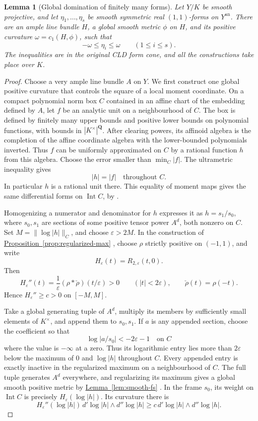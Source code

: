 \documentclass[11pt]{amsart}
\newtheorem{lemma}[theorem]{Lemma}
\theoremstyle{definition}
\theoremstyle{remark}
\numberwithin{equation}{section}
\newcommand{\an}{\mathrm{an}}
\newcommand{\Q}{\mathbf Q}
\newcommand{\namedref}[2]{%
 \begingroup
 \ifstrequal{#1}{Section}{\hypersetup{linkcolor=sectionteal}}{%
  \ifstrequal{#1}{Appendix}{\hypersetup{linkcolor=sectionteal}}{}}%
 \hyperref[#2]{#1~\ref*{#2}}%
 \endgroup}
\DeclareMathOperator{\Int}{Int}
\begin{document}
\begin{lemma}[Global domination of finitely many forms]
\label{lem:global-calibration}
Let \(Y/K\) be smooth projective, and let
\(\eta_1,\ldots,\eta_s\) be smooth symmetric real \((1,1)\)-forms
on \(Y^\an\). There are an ample line bundle \(H\), a global smooth
metric \(\phi\) on \(H\), and its positive curvature
\(\omega=c_1(H,\phi)\), such that
\[
 -\omega\leq\eta_i\leq\omega\qquad(1\leq i\leq s).
\]
The inequalities are in the original CLD form cone, and all the
constructions take place over \(K\).
\end{lemma}

\begin{proof}
Choose a very ample line bundle \(A\) on \(Y\). We first construct
one global positive curvature that controls the square of a local
moment coordinate. On a compact polynomial norm box \(C\) contained
in an affine chart of the embedding defined by \(A\), let \(f\) be
an analytic unit on a neighbourhood of \(C\). The box is defined by
finitely many upper bounds and positive lower bounds on polynomial
functions, with bounds in \(|K^\times|^\Q\). After clearing powers,
its affinoid algebra is the completion of the affine coordinate
algebra with the lower-bounded polynomials inverted.
Thus \(f\) can be uniformly approximated on \(C\) by a rational
function \(h\) from this algebra. Choose the error smaller than
\(\min_C|f|\). The ultrametric inequality gives
\[
 |h|=|f|\quad\text{throughout }C.
\]
In particular \(h\) is a rational unit there. This equality of
moment maps gives the same differential forms on \(\Int C\),
by \cite[Lemma 3.1.10]{CLD12}.

Homogenizing a numerator and denominator for \(h\) expresses it
as \(h=s_1/s_0\), where \(s_0,s_1\) are sections of some
positive tensor power \(A^d\), both nonzero on \(C\).
Set \(M=\|\log|h|\|_C\), and choose
\(\varepsilon>2M\). In the construction of
\namedref{Proposition}{prop:regularized-max}, choose \(\rho\) strictly
positive on \((-1,1)\), and write
\[
 H_\varepsilon(t)=R_{2,\varepsilon}(t,0).
\]
Then
\[
 H_\varepsilon''(t)
 =\frac1\varepsilon
   (\rho*\check\rho)(t/\varepsilon)>0
       \qquad(|t|<2\varepsilon),
 \qquad\check\rho(t)=\rho(-t).
\]
Hence \(H_\varepsilon''\geq c>0\) on \([-M,M]\).

Take a global generating tuple of \(A^d\), multiply its members
by sufficiently small elements of \(K^\times\), and append them
to \(s_0,s_1\). If \(a\) is any appended section, choose the
coefficient so that
\[
 \log|a/s_0|<-2\varepsilon-1
 \quad\text{on }C
\]
where the value is \(-\infty\) at a zero. Thus its logarithmic
entry lies more than \(2\varepsilon\) below the maximum of
\(0\) and \(\log|h|\) throughout \(C\).
Every appended entry is exactly inactive in the regularized
maximum on a neighbourhood of \(C\). The full tuple generates
\(A^d\) everywhere, and regularizing its maximum gives a global
smooth positive metric by \namedref{Lemma}{lem:smooth-fs}.
In the frame \(s_0\), its weight on \(\Int C\) is precisely
\(H_\varepsilon(\log|h|)\). Its curvature there is
\[
 H_\varepsilon''(\log|h|)
       \,d'\log|h|\wedge d''\log|h|
 \geq c\,d'\log|h|\wedge d''\log|h|.
\]


\end{proof}
\end{document}
